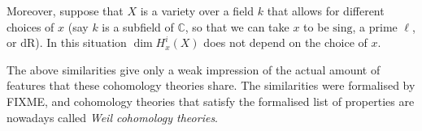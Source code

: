 \documentclass[a4paper,10pt]{article}
\begin{document}
Moreover, suppose that $X$ is a variety over a field $k$ that allows for
different choices of $x$ (say $k$ is a subfield of $\mathbb{C}$, so that we can
take $x$ to be $\mathrm{sing}$, a prime $\ell$, or $\mathrm{dR}$). In this
situation $\dim H_{x}^{i}(X)$ does not depend on the choice of $x$.

The above similarities give only a weak impression of the actual amount of
features that these cohomology theories share. The similarities were formalised
by FIXME, and cohomology theories that satisfy the formalised list of
properties are nowadays called \emph{Weil cohomology theories}.





\end{document}
